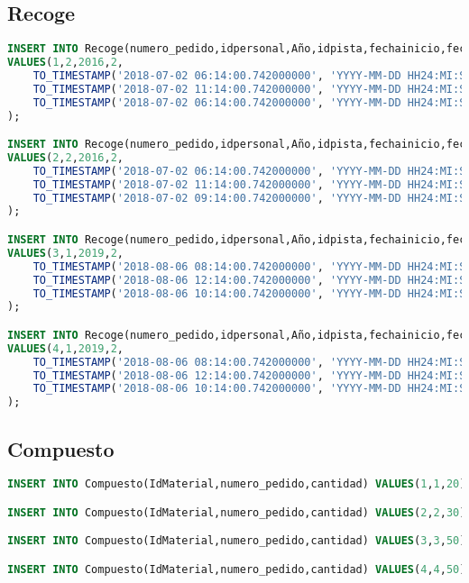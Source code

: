 \subsection{Recoge}
\begin{lstlisting}[language=sql]
INSERT INTO Recoge(numero_pedido,idpersonal,Año,idpista,fechainicio,fechafin,fecha)
VALUES(1,2,2016,2,
	TO_TIMESTAMP('2018-07-02 06:14:00.742000000', 'YYYY-MM-DD HH24:MI:SS.FF'),
	TO_TIMESTAMP('2018-07-02 11:14:00.742000000', 'YYYY-MM-DD HH24:MI:SS.FF'),
	TO_TIMESTAMP('2018-07-02 06:14:00.742000000', 'YYYY-MM-DD HH24:MI:SS.FF')
);

INSERT INTO Recoge(numero_pedido,idpersonal,Año,idpista,fechainicio,fechafin,fecha)
VALUES(2,2,2016,2,
	TO_TIMESTAMP('2018-07-02 06:14:00.742000000', 'YYYY-MM-DD HH24:MI:SS.FF'),
	TO_TIMESTAMP('2018-07-02 11:14:00.742000000', 'YYYY-MM-DD HH24:MI:SS.FF'),
	TO_TIMESTAMP('2018-07-02 09:14:00.742000000', 'YYYY-MM-DD HH24:MI:SS.FF')
);

INSERT INTO Recoge(numero_pedido,idpersonal,Año,idpista,fechainicio,fechafin,fecha)
VALUES(3,1,2019,2,
	TO_TIMESTAMP('2018-08-06 08:14:00.742000000', 'YYYY-MM-DD HH24:MI:SS.FF'),
	TO_TIMESTAMP('2018-08-06 12:14:00.742000000', 'YYYY-MM-DD HH24:MI:SS.FF'),
	TO_TIMESTAMP('2018-08-06 10:14:00.742000000', 'YYYY-MM-DD HH24:MI:SS.FF')
);

INSERT INTO Recoge(numero_pedido,idpersonal,Año,idpista,fechainicio,fechafin,fecha)
VALUES(4,1,2019,2,
	TO_TIMESTAMP('2018-08-06 08:14:00.742000000', 'YYYY-MM-DD HH24:MI:SS.FF'),
	TO_TIMESTAMP('2018-08-06 12:14:00.742000000', 'YYYY-MM-DD HH24:MI:SS.FF'),
	TO_TIMESTAMP('2018-08-06 10:14:00.742000000', 'YYYY-MM-DD HH24:MI:SS.FF')
);
\end{lstlisting}

\subsection{Compuesto}
\begin{lstlisting}[language=sql]
INSERT INTO Compuesto(IdMaterial,numero_pedido,cantidad) VALUES(1,1,20);

INSERT INTO Compuesto(IdMaterial,numero_pedido,cantidad) VALUES(2,2,30);

INSERT INTO Compuesto(IdMaterial,numero_pedido,cantidad) VALUES(3,3,50);

INSERT INTO Compuesto(IdMaterial,numero_pedido,cantidad) VALUES(4,4,50);
\end{lstlisting}
